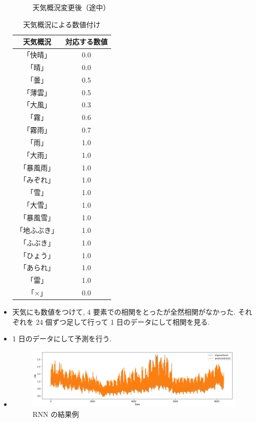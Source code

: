 \begin{itemize}
\begin{figure}[phb]
\caption{天気概況変更後（途中）}
\end{figure}
\begin{table}[t]
\centering
  \caption{天気概況による数値付け}
  \begin{tabular}{|c|c|} \hline
    天気概況 & 対応する数値 \\ \hline
    「快晴」 & 0.0 \\ \hline
    「晴」 & 0.0 \\ \hline
    「曇」 & 0.5 \\ \hline
    「薄雲」 & 0.5 \\ \hline
    「大風」 & 0.3 \\ \hline
    「霧」 & 0.6 \\ \hline
    「霧雨」 & 0.7 \\ \hline
    「雨」 & 1.0 \\ \hline
    「大雨」 & 1.0 \\ \hline
    「暴風雨」 & 1.0 \\ \hline
    「みぞれ」 & 1.0 \\ \hline
    「雪」 & 1.0 \\ \hline
    「大雪」 & 1.0 \\ \hline
    「暴風雪」 & 1.0 \\ \hline
    「地ふぶき」 & 1.0 \\ \hline
    「ふぶき」 & 1.0 \\ \hline
    「ひょう」 & 1.0 \\ \hline
    「あられ」 & 1.0 \\ \hline
    「雷」 & 1.0 \\ \hline
    「×」 & 0.0 \\ \hline
  \end{tabular}
\end{table}
        \item 天気にも数値をつけて, 4 要素での相関をとったが全然相関がなかった. それぞれを 24 個ずつ足して行って 1 日のデータにして相関を見る.
        \item 1 日のデータにして予測を行う.
        \item 

\begin{figure}[phb]
\centering
\includegraphics[scale=0.5]{kekka.png}
\caption{RNN の結果例}
\end{figure}
\end{itemize}

